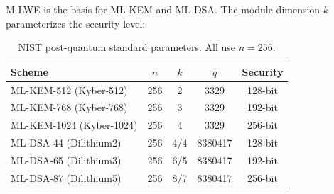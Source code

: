 M-LWE is the basis for ML-KEM and ML-DSA. The module dimension $k$
parameterizes the security level:

\begin{table}[H]
\centering
\small
\begin{tabular}{@{}lcccc@{}}
\toprule
\textbf{Scheme} & $n$ & $k$ & $q$ & \textbf{Security} \\
\midrule
ML-KEM-512 (Kyber-512) & 256 & 2 & 3329 & 128-bit \\
ML-KEM-768 (Kyber-768) & 256 & 3 & 3329 & 192-bit \\
ML-KEM-1024 (Kyber-1024) & 256 & 4 & 3329 & 256-bit \\
ML-DSA-44 (Dilithium2) & 256 & 4/4 & 8380417 & 128-bit \\
ML-DSA-65 (Dilithium3) & 256 & 6/5 & 8380417 & 192-bit \\
ML-DSA-87 (Dilithium5) & 256 & 8/7 & 8380417 & 256-bit \\
\bottomrule
\end{tabular}
\caption{NIST post-quantum standard parameters. All use $n = 256$.}
\end{table}

